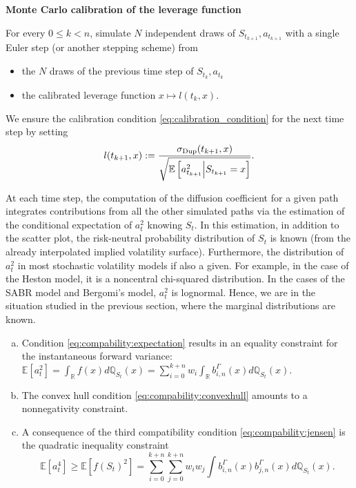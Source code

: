 \documentclass[a4paper]{article}
\newcommand{\1}{\textbf{1}}
\newcommand{\Q}{\mathbb{Q}}
\newcommand{\R}{\mathbb{R}}
\newcommand{\E}{\mathbb{E}}
\begin{document}
\vspace{2mm}
\begin{samepage}
\begin{breakbox}
\par \noindent \textbf{Monte Carlo calibration of the leverage function \cite{GuyonLabordereParticular}}
\par \noindent For every $0 \leq k < n$, simulate $N$ independent draws of $S_{t_{k+1}}, a_{t_{k+1}}$ with a single Euler step (or another stepping scheme) from
\begin{itemize}
\item the $N$ draws of the previous time step of $S_{t_k}, a_{t_k}$
\item the calibrated leverage function $x \mapsto l(t_k,x)$. 
\end{itemize}
We ensure the calibration condition \eqref{eq:calibration_condition} for the next time step by setting
$$
l(t_{k+1}, x) := \frac{\sigma_{\textnormal{Dup}}(t_{k+1}, x)}{\sqrt{\E \left[a_{t_{k+1}}^2 \middle| S_{t_{k+1}} = x \right]}}. 
$$
\end{breakbox}
\end{samepage}
\vspace{2mm}
\par At each time step, the computation of the diffusion coefficient for a given path integrates contributions from all the other simulated paths via the estimation of the conditional expectation of $a_t^2$ knowing $S_t$. In this estimation, in addition to the scatter plot, the risk-neutral probability distribution of $S_t$ is known (from the already interpolated implied volatility surface). Furthermore, the distribution of $a^2_t$ in most stochastic volatility models if also a given. For example, in the case of the Heston model, it is a noncentral chi-squared distribution. In the cases of the SABR model and Bergomi's model, $a^2_t$ is lognormal. Hence, we are in the situation studied in the previous section, where the marginal distributions are known. 
\begin{enumerate}[(a)]
\item Condition \eqref{eq:compability:expectation} results in an equality constraint for the instantaneous forward variance: $\E\left[a_t^2\right] = \int_\R f(x) d\Q_{S_t}(x) = \sum\limits_{i=0}^{k+n}w_i \int_\R b^\Gamma_{i,n}(x) d\Q_{S_t}(x)$.
\item The convex hull condition \eqref{eq:compability:convexhull} amounts to a nonnegativity constraint. 
\item A consequence of the third compatibility condition \eqref{eq:compability:jensen} is the quadratic inequality constraint
\begin{equation}\label{eq:quadratic_constraint_slv}
\E\left[a_t^4\right] \geq \E\left[f(S_t)^2\right] = \sum\limits_{i=0}^{k + n} \sum\limits_{j=0}^{k + n} w_i w_j \int b^\Gamma_{i,n}(x) b^\Gamma_{j,n}(x) d\Q_{S_t}(x).
\end{equation}
\end{enumerate}
\end{document}
